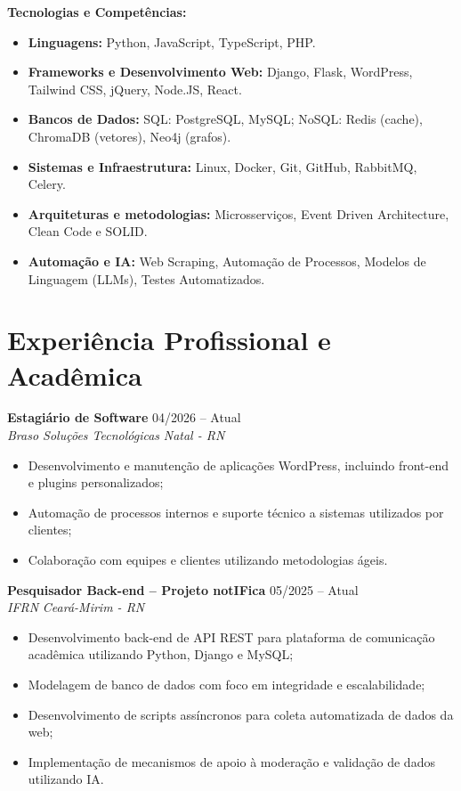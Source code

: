 \documentclass[a4paper,10pt]{article}
\newcommand{\entry}[4]{
  \noindent\textbf{#1} \hfill #2 \\
  \noindent\textit{#3} \hfill \textit{#4} \\
  \vspace{1pt}
}
\begin{document}
\noindent\textbf{Tecnologias e Competências:}
\begin{itemize}
\item \textbf{Linguagens:} Python, JavaScript, TypeScript, PHP.
\item \textbf{Frameworks e Desenvolvimento Web:} Django, Flask, WordPress, Tailwind CSS, jQuery, Node.JS, React.
\item \textbf{Bancos de Dados:} SQL: PostgreSQL, MySQL; NoSQL: Redis (cache), ChromaDB (vetores), Neo4j (grafos).
\item \textbf{Sistemas e Infraestrutura:} Linux, Docker, Git, GitHub, RabbitMQ, Celery.
\item \textbf{Arquiteturas e metodologias:} Microsserviços, Event Driven Architecture, Clean Code e SOLID.
\item \textbf{Automação e IA:} Web Scraping, Automação de Processos, Modelos de Linguagem (LLMs), Testes Automatizados.
\end{itemize}

\section*{Experiência Profissional e Acadêmica}


\entry{Estagiário de Software}{04/2026 -- Atual}{Braso Soluções Tecnológicas}{Natal - RN}
\begin{itemize}
\item Desenvolvimento e manutenção de aplicações WordPress, incluindo front-end e plugins personalizados;
\item Automação de processos internos e suporte técnico a sistemas utilizados por clientes;
\item Colaboração com equipes e clientes utilizando metodologias ágeis.
\end{itemize}

\vspace{1pt}

\entry{Pesquisador Back-end -- Projeto notIFica}{05/2025 -- Atual}{IFRN}{Ceará-Mirim - RN}
\begin{itemize}
\item Desenvolvimento back-end de API REST para plataforma de comunicação acadêmica utilizando Python, Django e MySQL;
\item Modelagem de banco de dados com foco em integridade e escalabilidade;
\item Desenvolvimento de scripts assíncronos para coleta automatizada de dados da web;
\item Implementação de mecanismos de apoio à moderação e validação de dados utilizando IA.
\end{itemize}
\end{document}
